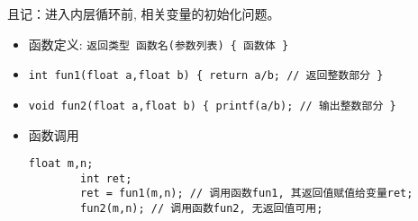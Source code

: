 \begin{note}[特别注意]
	且记：进入内层循环前, 相关变量的初始化问题。	
\end{note}

\begin{note}[函数定义和调用]
	\begin{itemize}
		\item 函数定义: \lstinline|返回类型 函数名(参数列表) { 函数体 }|
		\item \lstinline|int fun1(float a,float b) { return a/b; // 返回整数部分 }| 
		\item \lstinline|void fun2(float a,float b) { printf(a/b); // 输出整数部分 }| 
		\item 函数调用
		\begin{lstlisting}[frame=none]
		float m,n;
		int ret;
		ret = fun1(m,n); // 调用函数fun1, 其返回值赋值给变量ret;
		fun2(m,n); // 调用函数fun2, 无返回值可用;
		\end{lstlisting}
	\end{itemize}	
\end{note}


